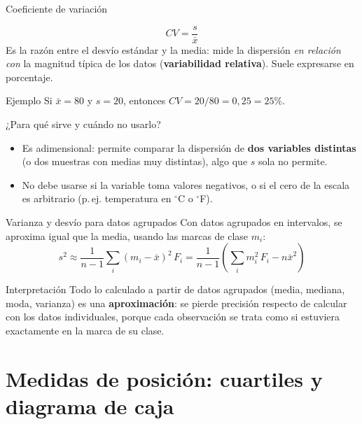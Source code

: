 \documentclass[aspectratio=169,11pt]{beamer}
\begin{document}
\begin{frame}{Coeficiente de variación}
\begin{definition}
\[
CV = \frac{s}{\bar{x}}
\]
Es la razón entre el desvío estándar y la media: mide la dispersión \emph{en relación con} la magnitud típica de los datos (\textbf{variabilidad relativa}). Suele expresarse en porcentaje.
\end{definition}
\begin{exampleblock}{Ejemplo}
Si $\bar{x}=80$ y $s=20$, entonces $CV=20/80=0{,}25=25\%$.
\end{exampleblock}
\begin{alertblock}{¿Para qué sirve y cuándo no usarlo?}
\begin{itemize}
\item Es adimensional: permite comparar la dispersión de \textbf{dos variables distintas} (o dos muestras con medias muy distintas), algo que $s$ sola no permite.
\item No debe usarse si la variable toma valores negativos, o si el cero de la escala es arbitrario (p.\,ej. temperatura en $^\circ$C o $^\circ$F).
\end{itemize}
\end{alertblock}
\end{frame}

\begin{frame}{Varianza y desvío para datos agrupados}
Con datos agrupados en intervalos, se aproxima igual que la media, usando las marcas de clase $m_i$:
\[
s^2 \approx \frac{1}{n-1}\sum_i (m_i-\bar{x})^2\,F_i = \frac{1}{n-1}\left(\sum_i m_i^2\,F_i - n\bar{x}^2\right)
\]
\begin{alertblock}{Interpretación}
Todo lo calculado a partir de datos agrupados (media, mediana, moda, varianza) es una \textbf{aproximación}: se pierde precisión respecto de calcular con los datos individuales, porque cada observación se trata como si estuviera exactamente en la marca de su clase.
\end{alertblock}
\end{frame}

\section{Medidas de posición: cuartiles y diagrama de caja}
\end{document}
